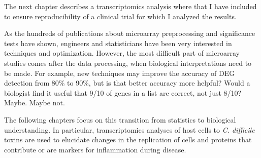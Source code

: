The next chapter describes a transcriptomics
analysis where that I have included to ensure reproducibility
of a clinical trial for which I analyzed the results.

As the hundreds of publications about microarray preprocessing
and significance tests have shown, engineers
and statisticians have been very interested in techniques and optimization.
However, the most difficult part of microarray studies comes
after the data processing, when biological interpretations need 
to be made. For example, new techniques may improve the accuracy
of DEG detection from 80\% to 90\%, but is that better accuracy
more helpful? Would a biologist find it useful that 9/10 of 
genes in a list are correct, not just 8/10? Maybe. Maybe not.

The following chapters focus on this transition from statistics
to biological understanding. In particular, transcriptomics analyses
of host cells to \textit{C. difficile} toxins are used to elucidate
changes in the replication of cells and proteins that contribute
or are markers for inflammation during disease.







